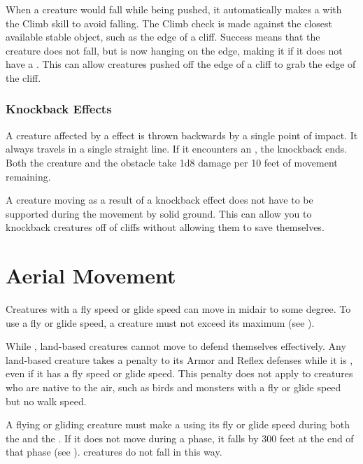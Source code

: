       When a creature would fall while being pushed, it automatically makes a  with the Climb skill to avoid falling.
      The Climb check is made against the closest available stable object, such as the edge of a cliff.
      Success means that the creature does not fall, but is now hanging on the edge, making it \unsteady if it does not have a .
      This can allow creatures pushed off the edge of a cliff to grab the edge of the cliff.

    \subsubsection{Knockback Effects}\label{Knockback Effects}
      A creature affected by a  effect is thrown backwards by a single point of impact.
      It always travels in a single straight line.
      If it encounters an , the knockback ends.
      Both the creature and the obstacle take 1d8 damage per 10 feet of movement remaining.

      A creature moving as a result of a knockback effect does not have to be supported during the movement by solid ground.
      This can allow you to knockback creatures off of cliffs without allowing them to save themselves.

\section{Aerial Movement}\label{Aerial Movement}
  Creatures with a fly speed or glide speed can move in midair to some degree.
  To use a fly or glide speed, a creature must not exceed its maximum  (see ).

  While , land-based creatures cannot move to defend themselves effectively.
  Any land-based creature takes a  penalty to its Armor and Reflex defenses while it is , even if it has a fly speed or glide speed.
  This penalty does not apply to creatures who are native to the air, such as birds and monsters with a fly or glide speed but no walk speed.

  A flying or gliding creature must make a  using its fly or glide speed during both the  and the .
  If it does not move during a phase, it falls by 300 feet at the end of that phase (see ).
   creatures do not fall in this way.

